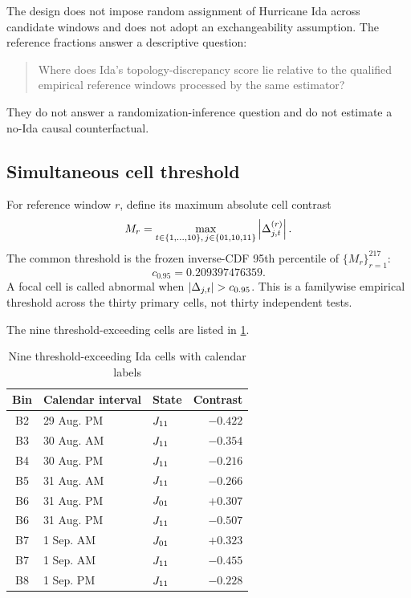 \documentclass[11pt]{article}
\begin{document}
The design does not impose random assignment of Hurricane Ida across candidate windows and does not adopt an exchangeability assumption. The reference fractions answer a descriptive question:
\begin{quote}
Where does Ida's topology-discrepancy score lie relative to the qualified empirical reference windows processed by the same estimator?
\end{quote}
They do not answer a randomization-inference question and do not estimate a no-Ida causal counterfactual.

\subsection{Simultaneous cell threshold}

For reference window $r$, define its maximum absolute cell contrast
\begin{equation}
M_r=\max_{t\in\{1,\ldots,10\},\,j\in\{01,10,11\}}
\left|\Delta^{(r)}_{j,t}\right|.
\end{equation}
The common threshold is the frozen inverse-CDF 95th percentile of $\{M_r\}_{r=1}^{217}$:
\begin{equation}
c_{0.95}=0.209397476359.
\label{eq:threshold}
\end{equation}
A focal cell is called abnormal when $\abs{\Delta_{j,t}}>c_{0.95}$. This is a familywise empirical threshold across the thirty primary cells, not thirty independent tests.

The nine threshold-exceeding cells are listed in \cref{tab:abnormal}.

\begin{table}[H]
\centering
\caption{Nine threshold-exceeding Ida cells with calendar labels}
\label{tab:abnormal}
\begin{tabular}{@{}cllr@{}}
\toprule
Bin & Calendar interval & State & Contrast \\
\midrule
B2 & 29 Aug. PM & $J_{11}$ & $-0.422$ \\
B3 & 30 Aug. AM & $J_{11}$ & $-0.354$ \\
B4 & 30 Aug. PM & $J_{11}$ & $-0.216$ \\
B5 & 31 Aug. AM & $J_{11}$ & $-0.266$ \\
B6 & 31 Aug. PM & $J_{01}$ & $+0.307$ \\
B6 & 31 Aug. PM & $J_{11}$ & $-0.507$ \\
B7 & 1 Sep. AM & $J_{01}$ & $+0.323$ \\
B7 & 1 Sep. AM & $J_{11}$ & $-0.455$ \\
B8 & 1 Sep. PM & $J_{11}$ & $-0.228$ \\
\bottomrule
\end{tabular}
\end{table}
\end{document}

